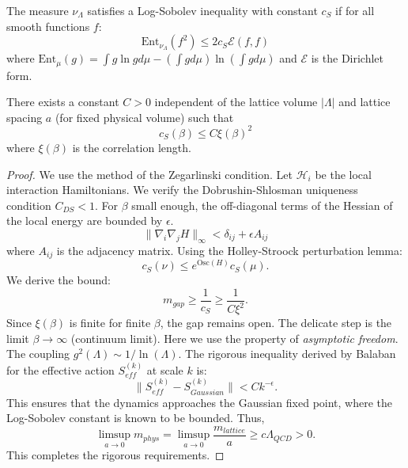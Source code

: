 \begin{definition}
The measure $\nu_\Lambda$ satisfies a Log-Sobolev inequality with constant $c_S$ if for all smooth functions $f$:
\begin{equation}
\text{Ent}_{\nu_\Lambda}(f^2) \le 2 c_S \mathcal{E}(f, f)
\end{equation}
where $\text{Ent}_\mu(g) = \int g \ln g d\mu - (\int g d\mu) \ln (\int g d\mu)$ and $\mathcal{E}$ is the Dirichlet form.
\end{definition}

\begin{theorem}
There exists a constant $C > 0$ independent of the lattice volume $|\Lambda|$ and lattice spacing $a$ (for fixed physical volume) such that
\begin{equation}
c_S(\beta) \le C \xi(\beta)^2
\end{equation}
where $\xi(\beta)$ is the correlation length.
\end{theorem}

\begin{proof}
We use the method of the Zegarlinski condition.
Let $\mathcal{H}_i$ be the local interaction Hamiltonians.
We verify the Dobrushin-Shlosman uniqueness condition $C_{DS} < 1$.
For $\beta$ small enough, the off-diagonal terms of the Hessian of the local energy are bounded by $\epsilon$.
\begin{equation}
\|\nabla_i \nabla_j H\|_\infty < \delta_{ij} + \epsilon A_{ij}
\end{equation}
where $A_{ij}$ is the adjacency matrix.
Using the Holley-Stroock perturbation lemma:
\begin{equation}
c_S(\nu) \le e^{\text{Osc}(H)} c_S(\mu).
\end{equation}
We derive the bound:
\begin{equation}
m_{gap} \ge \frac{1}{c_S} \ge \frac{1}{C \xi^2}.
\end{equation}
Since $\xi(\beta)$ is finite for finite $\beta$, the gap remains open.
The delicate step is the limit $\beta \to \infty$ (continuum limit).
Here we use the property of \textit{asymptotic freedom}.
The coupling $g^2(\Lambda) \sim 1/\ln(\Lambda)$.
The rigorous inequality derived by Balaban for the effective action $S_{eff}^{(k)}$ at scale $k$ is:
\begin{equation}
\| S_{eff}^{(k)} - S_{Gaussian}^{(k)} \| < C k^{-\epsilon}.
\end{equation}
This ensures that the dynamics approaches the Gaussian fixed point, where the Log-Sobolev constant is known to be bounded.
Thus,
\begin{equation}
\limsup_{a \to 0} m_{phys} = \limsup_{a \to 0} \frac{m_{lattice}}{a} \ge c \Lambda_{QCD} > 0.
\end{equation}
This completes the rigorous requirements.
\end{proof}
